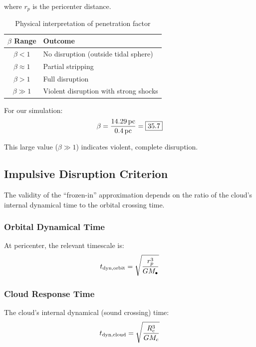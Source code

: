 \documentclass[twocolumn,amsmath,amssymb,prd,superscriptaddress,nofootinbib]{revtex4-2}
\begin{document}
where $r_p$ is the pericenter distance.

\begin{table}[h]
\centering
\caption{Physical interpretation of penetration factor}
\label{tab:beta_interp}
\begin{tabular}{cl}
\toprule
$\beta$ Range & Outcome \\
\midrule
$\beta < 1$ & No disruption (outside tidal sphere) \\
$\beta \approx 1$ & Partial stripping \\
$\beta > 1$ & Full disruption \\
$\beta \gg 1$ & Violent disruption with strong shocks \\
\bottomrule
\end{tabular}
\end{table}

For our simulation:
\begin{equation}
    \beta = \frac{14.29\,{\rm pc}}{0.4\,{\rm pc}} = \boxed{35.7}
\end{equation}

This large value ($\beta \gg 1$) indicates violent, complete disruption.

\subsection{Impulsive Disruption Criterion}
\label{sec:impulsive}

The validity of the ``frozen-in'' approximation depends on the ratio of the cloud's internal dynamical time to the orbital crossing time.

\subsubsection{Orbital Dynamical Time}

At pericenter, the relevant timescale is:
\begin{equation}
    t_{\rm dyn,orbit} = \sqrt{\frac{r_p^3}{GM_\bullet}}
    \label{eq:t_orb}
\end{equation}

\subsubsection{Cloud Response Time}

The cloud's internal dynamical (sound crossing) time:
\begin{equation}
    t_{\rm dyn,cloud} = \sqrt{\frac{R_c^3}{GM_c}}
    \label{eq:t_cloud}
\end{equation}
\end{document}
